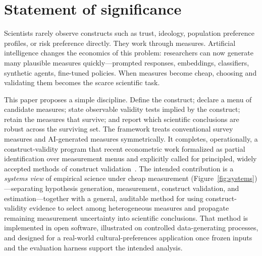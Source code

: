 \documentclass[10pt,letterpaper]{article}
\begin{document}
\vspace{0.85em}
\section*{Statement of significance}
Scientists rarely observe constructs such as trust, ideology, population preference profiles, or risk preference directly. They work through measures.
Artificial intelligence changes the economics of this problem: researchers can now generate many plausible measures quickly---prompted responses, embeddings, classifiers, synthetic agents, fine-tuned policies.
When measures become cheap, choosing and validating them becomes the scarce scientific task.

This paper proposes a simple discipline.
Define the construct; declare a menu of candidate measures; state observable validity tests implied by the construct; retain the measures that survive; and report which scientific conclusions are robust across the surviving set.
The framework treats conventional survey measures and AI-generated measures symmetrically.
It completes, operationally, a construct-validity program that recent econometric work formalized as partial identification over measurement menus and explicitly called for principled, widely accepted methods of construct validation~\cite{dellrambachan2026}.
The intended contribution is a \emph{systems view} of empirical science under cheap measurement (Figure~\ref{fig:systems})---separating hypothesis generation, measurement, construct validation, and estimation---together with a general, auditable method for using construct-validity evidence to select among heterogeneous measures and propagate remaining measurement uncertainty into scientific conclusions.
That method is implemented in open software, illustrated on controlled data-generating processes, and designed for a real-world cultural-preferences application once frozen inputs and the evaluation harness support the intended analysis.
\end{document}
